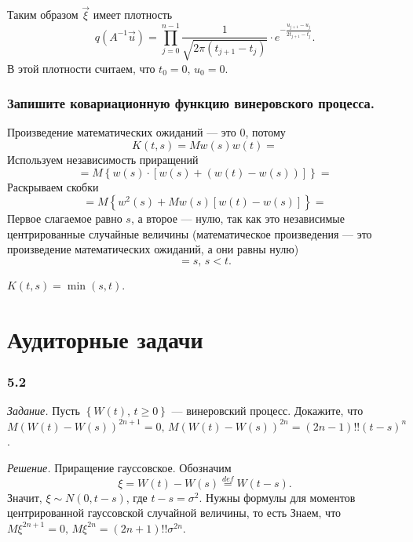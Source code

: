 Таким образом $ \vec{ \xi }$ имеет плотность
$$q \left( A^{-1} \vec{u} \right) =
  \prod \limits_{j = 0}^{n - 1}
    \frac{1}{ \sqrt{2 \pi \left( t_{j + 1} - t_j \right) }} \cdot e^{-\frac{u_{j + 1} - u_j}{2t_{j + 1} - t_j}}.$$
В этой плотности считаем, что $t_0 = 0, \, u_0 = 0$.

\subsubsection*{Запишите ковариационную функцию винеровского процесса.}

Произведение математических ожиданий --- это 0, потому
$$K \left( t, s \right) =
  Mw \left( s \right) w \left( t \right) =$$
Используем независимость приращений
$$= M \left\{
    w \left( s \right) \cdot
    \left[ w \left( s \right) + \left( w \left( t \right) - w \left( s \right) \right) \right]
  \right\} =$$
Раскрываем скобки
$$= M \left\{
    w^2 \left(s \right) + Mw \left( s \right) \left[ w \left( t \right) - w \left( s \right) \right]
  \right\} =$$
Первое слагаемое равно $s$, а второе --- нулю,
так как это независимые центрированные случайные величины (математическое произведения ---
это произведение математических ожиданий, а они равны нулю)
$$= s, \,
  s < t.$$

$K \left( t, s \right) = \min \left( s, t \right) $.

\section*{Аудиторные задачи}

\subsubsection*{5.2}

\textit{Задание.}
Пусть $ \left\{ W \left( t \right), \, t \geq 0 \right\} $ --- винеровский процесс.
Докажите, что
$M \left( W \left( t \right) - W \left( s \right) \right)^{2n + 1} = 0, \,
  M \left( W \left( t \right) - W \left( s \right) \right)^{2n} =
  \left( 2n - 1 \right)!! \left( t - s \right)^n$.

\textit{Решение.}
Приращение гауссовское.
Обозначим
$$ \xi =
  W \left( t \right) - W \left( s \right) \overset{def}{=}
  W \left( t - s \right).$$
Значит, $ \xi \sim N \left( 0, t - s \right) $, где $t - s = \sigma^2$.
Нужны формулы для моментов центрированной гауссовской случайной величины, то есть
Знаем, что $M \xi^{2n + 1} = 0, \, M \xi^{2n} = \left( 2n + 1 \right)!! \sigma^{2n}$.

